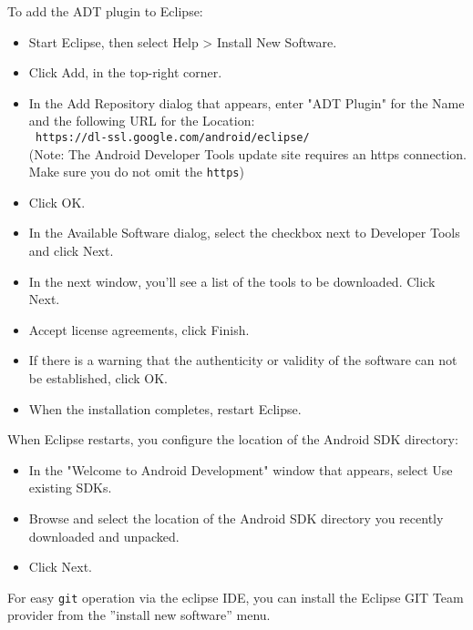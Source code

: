 To add the ADT plugin to Eclipse:
\begin{itemize}
\item    Start Eclipse, then select Help > Install New Software.
\item    Click Add, in the top-right corner.
\item    In the Add Repository dialog that appears, enter "ADT Plugin" for the Name and the following URL for the Location:\\
   \texttt{ https://dl-ssl.google.com/android/eclipse/}\\
   (Note: The Android Developer Tools update site requires an https connection. Make sure you do not omit the \texttt{https})
\item    Click OK.
\item    In the Available Software dialog, select the checkbox next to Developer Tools and click Next.
\item    In the next window, you'll see a list of the tools to be downloaded. Click Next.
\item    Accept license agreements, click Finish.
\item    If there is a warning that the authenticity or validity of the software can not be established, click OK.
\item    When the installation completes, restart Eclipse.
\end{itemize}

When Eclipse restarts, you configure the location of the Android SDK directory:

\begin{itemize}
\item In the "Welcome to Android Development" window that appears, select Use existing SDKs.
\item Browse and select the location of the Android SDK directory you recently downloaded and unpacked.
\item Click Next.
\end{itemize}

For easy \texttt{git} operation via the eclipse IDE, you can install the Eclipse GIT Team provider from the ''install new software'' menu.

